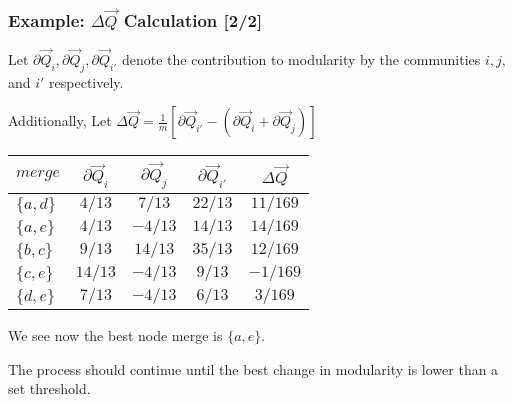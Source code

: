 \documentclass{beamer}
\newcommand{\ds}{\displaystyle}
\begin{document}
\begin{frame}

    \frametitle{Example: $ \Delta \vec{Q} $ Calculation [2/2]}

    Let $ \partial \vec{Q}_{i}, \partial \vec{Q}_{j}, \partial \vec{Q}_{i'} $ denote the contribution to modularity by the communities $ i, j, $ and $ i' $ respectively.\pause

    \vspace{2.5mm}
    Additionally, Let $ \ds \Delta \vec{Q} = \frac{1}{m} \left[ \partial \vec{Q}_{i'} - (\partial \vec{Q}_{i} + \partial \vec{Q}_{j}) \right] $\pause

    \vspace{2.5mm}
    \begin{center}
        \begin{tabular}{l | c c c c} 
            $ merge    $ & $ \partial \vec{Q}_{i} $ & $ \partial \vec{Q}_{j} $ & $ \partial \vec{Q}_{i'} $ & $ \Delta \vec{Q} $ \\
            \hline
            $ \{a, d\} $ & $ 4/13  $ & $  7/13  $ & $ 22/13 $ & $ 11/169 $ \\
            \rowcolor{ummaize}
            $ \{a, e\} $ & $ 4/13  $ & $ -4/13  $ & $ 14/13 $ & $ 14/169 $ \\
            $ \{b, c\} $ & $  9/13 $ & $  14/13 $ & $ 35/13 $ & $ 12/169 $ \\
            $ \{c, e\} $ & $ 14/13 $ & $ -4/13  $ & $  9/13 $ & $ -1/169 $ \\
            $ \{d, e\} $ & $  7/13 $ & $ -4/13  $ & $  6/13 $ & $  3/169 $ \\
        \end{tabular}
    \end{center}\pause

    \vspace{2.5mm}
    We see now the best node merge is $ \{a, e\} $.\pause

    \vspace{2.5mm}
    The process should continue until the best change in modularity is lower than a set threshold. 

\end{frame}
\end{document}
